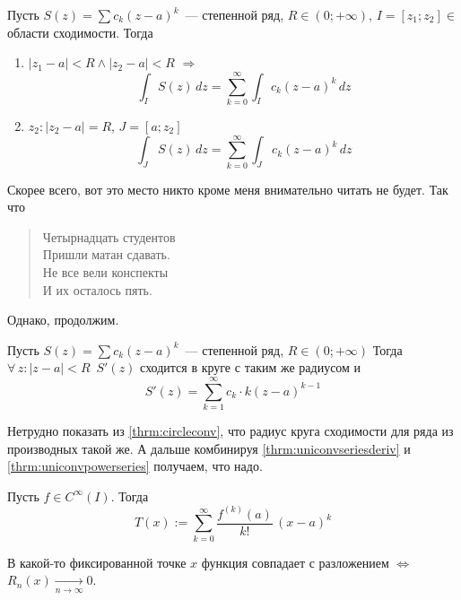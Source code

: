 \documentclass[12pt]{../../notes}
\begin{document}
\begin{thrm}\label{thrm:powerseriesint}
  Пусть $S(z) = \sum c_k (z-a)^k$~--- степенной ряд, $R\in(0;+\infty)$, $I=[z_1; z_2]\in$ области сходимости.
  Тогда
  \begin{enumerate}
    \item $|z_1 - a| < R \wedge |z_2 - a| < R$ $\Rightarrow$ 
      \[
        \int_I S(z)\,dz = \sum_{k=0}^\infty \int_I c_k (z - a)^k\,dz
      \]
    \item $z_2 \colon |z_2 - a| = R$, $J = [a;z_2]$ 
      \[
        \int_J S(z)\,dz = \sum_{k=0}^\infty \int_J c_k (z - a)^k\,dz
      \]
  \end{enumerate}
\end{thrm}
{\small
Скорее всего, вот это место никто кроме меня внимательно читать не будет.
Так что
\begin{verse}
Четырнадцать студентов \\
Пришли матан сдавать. \\
Не все вели конспекты \\
И их осталось пять. \\
\end{verse}
Однако, продолжим.
}

\begin{thrm}\label{thrm:powerseriesder}
  Пусть $S(z) = \sum c_k (z-a)^k$~--- степенной ряд, $R\in(0;+\infty)$
  Тогда $\forall\, z\colon |z-a| < R \;\: S'(z)$ сходится в круге с таким же радиусом и
  \[
    S'(z) = \sum_{k=1}^{\infty} c_k \cdot k (z-a)^{k-1} 
  \]
\end{thrm}
\begin{ittproof}
  Нетрудно показать из \ref{thrm:circleconv}, что радиус круга сходимости для ряда из производных такой же.
  А дальше комбинируя \ref{thrm:uniconvseriesderiv} и \ref{thrm:uniconvpowerseries} получаем, что надо.
\end{ittproof}


\begin{defn}\label{defn:taylorseries}
  Пусть $f\in C^\infty(I)$. Тогда
  \[
    T(x) := \sum_{k=0}^{\infty} \frac{f^{(k)}(a)}{k!}\,(x-a)^k
  \]
\end{defn}

\begin{lem}\label{lem:taylresid}
  В какой-то фиксированной точке $x$ функция совпадает с разложением 
  $\Leftrightarrow$ $R_n(x) \xrightarrow[n\to\infty]{} 0$.
\end{lem}
\end{document}
